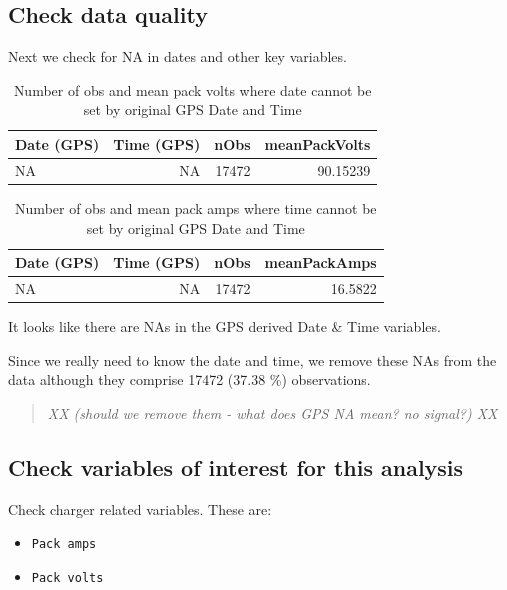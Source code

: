 \documentclass[]{article}
\providecommand{\tightlist}{%
  \setlength{\itemsep}{0pt}\setlength{\parskip}{0pt}}
\begin{document}
\subsection{Check data quality}\label{check-data-quality}

Next we check for NA in dates and other key variables.

\begin{table}

\caption{\label{tab:checkVolts}Number of obs and mean pack volts where date cannot be set by original GPS Date and Time}
\centering
\begin{tabular}[t]{l|r|r|r}
\hline
Date (GPS) & Time (GPS) & nObs & meanPackVolts\\
\hline
NA & NA & 17472 & 90.15239\\
\hline
\end{tabular}
\end{table}

\begin{table}

\caption{\label{tab:checkAmps}Number of obs and mean pack amps where time cannot be set by original GPS Date and Time}
\centering
\begin{tabular}[t]{l|r|r|r}
\hline
Date (GPS) & Time (GPS) & nObs & meanPackAmps\\
\hline
NA & NA & 17472 & 16.5822\\
\hline
\end{tabular}
\end{table}

It looks like there are NAs in the GPS derived Date \& Time variables.

Since we really need to know the date and time, we remove these NAs from
the data although they comprise 17472 (37.38 \%) observations.

\begin{quote}
\emph{XX (should we remove them - what does GPS NA mean? no signal?) XX
}
\end{quote}

\subsection{Check variables of interest for this
analysis}\label{check-variables-of-interest-for-this-analysis}

Check charger related variables. These are:

\begin{itemize}
\tightlist
\item
  \texttt{Pack\ amps}
\item
  \texttt{Pack\ volts}
\end{itemize}
\end{document}
